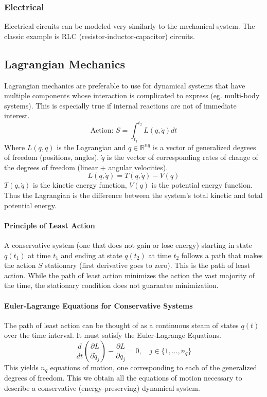 \documentclass[../notes.tex]{subfiles}
\begin{document}
\subsubsection{Electrical}
Electrical circuits can be modeled very similarly to the mechanical system. The classic example is RLC (resistor-inductor-capacitor) circuits.


\subsection{Lagrangian Mechanics}
Lagrangian mechanics are preferable to use for dynamical systems that have multiple components whose interaction is complicated to express (eg. multi-body systems). This is especially true if internal reactions are not of immediate interest.
\begin{equation} \label{eq:lagrangian}
    \text{Action: } S = \int_{t_1}^{t_2} L(q, \dot{q})dt
\end{equation}
Where $L(q, \dot{q})$ is the Lagrangian and $q\in \mathbb{R}^{nq}$ is a vector of generalized degrees of freedom (positions, angles). $\dot{q}$ is the vector of corresponding rates of change of the degrees of freedom (linear + angular velocities).
\begin{equation}
    L(q, \dot{q}) = T(q, \dot{q}) - V(q)
\end{equation}
$T(q, \dot{q})$ is the kinetic energy function, $V(q)$ is the potential energy function. Thus the Lagrangian is the difference between the system's total kinetic and total potential energy.
\paragraph{Principle of Least Action} A conservative system (one that does not gain or lose energy) starting in state $q(t_1)$ at time $t_1$ and ending at state $q(t_2)$ at time $t_2$ follows a path that makes the action $S$ stationary (first derivative goes to zero). This is the path of least action. While the path of least action minimizes the action the vast majority of the time, the stationary condition does not guarantee minimization.
\paragraph{Euler-Lagrange Equations for Conservative Systems} The path of least action can be thought of as a continuous steam of states $q(t)$ over the time interval. It must satisfy the Euler-Lagrange Equations.
\begin{equation} \label{eq:eulerLagrangeCons}
    \frac{d}{dt}(\frac{\partial L}{\partial \dot{q}_j}) - \frac{\partial L}{\partial q_j} = 0, \quad j \in \{1, ..., n_q\}
\end{equation}
This yields $n_q$ equations of motion, one corresponding to each of the generalized degrees of freedom. This we obtain all the equations of motion necessary to describe a conservative (energy-preserving) dynamical system.
\end{document}
